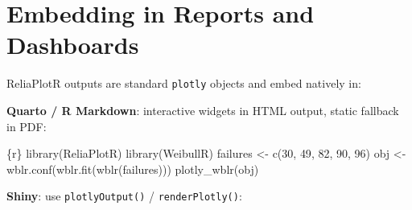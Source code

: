 \documentclass[
  letterpaper,
  DIV=11,
  numbers=noendperiod]{scrreprt}
\newenvironment{Shaded}{\begin{snugshade}}{\end{snugshade}}
\newcommand{\ControlFlowTok}[1]{\textcolor[rgb]{0.00,0.23,0.31}{\textbf{#1}}}
\newcommand{\DecValTok}[1]{\textcolor[rgb]{0.68,0.00,0.00}{#1}}
\newcommand{\FunctionTok}[1]{\textcolor[rgb]{0.28,0.35,0.67}{#1}}
\newcommand{\InformationTok}[1]{\textcolor[rgb]{0.37,0.37,0.37}{#1}}
\newcommand{\NormalTok}[1]{\textcolor[rgb]{0.00,0.23,0.31}{#1}}
\newcommand{\OtherTok}[1]{\textcolor[rgb]{0.00,0.23,0.31}{#1}}
\newcommand{\SpecialCharTok}[1]{\textcolor[rgb]{0.37,0.37,0.37}{#1}}
\newcommand{\StringTok}[1]{\textcolor[rgb]{0.13,0.47,0.30}{#1}}
\begin{document}
\section{Embedding in Reports and
Dashboards}\label{embedding-in-reports-and-dashboards}

ReliaPlotR outputs are standard \texttt{plotly} objects and embed
natively in:

\textbf{Quarto / R Markdown}: interactive widgets in HTML output, static
fallback in PDF:

\begin{Shaded}
\begin{Highlighting}[]
\InformationTok{\textasciigrave{}\textasciigrave{}\textasciigrave{}\{r\}}
\FunctionTok{library}\NormalTok{(ReliaPlotR)}
\FunctionTok{library}\NormalTok{(WeibullR)}
\NormalTok{failures }\OtherTok{\textless{}{-}} \FunctionTok{c}\NormalTok{(}\DecValTok{30}\NormalTok{, }\DecValTok{49}\NormalTok{, }\DecValTok{82}\NormalTok{, }\DecValTok{90}\NormalTok{, }\DecValTok{96}\NormalTok{)}
\NormalTok{obj }\OtherTok{\textless{}{-}} \FunctionTok{wblr.conf}\NormalTok{(}\FunctionTok{wblr.fit}\NormalTok{(}\FunctionTok{wblr}\NormalTok{(failures)))}
\FunctionTok{plotly\_wblr}\NormalTok{(obj)}
\InformationTok{\textasciigrave{}\textasciigrave{}\textasciigrave{}}
\end{Highlighting}
\end{Shaded}

\textbf{Shiny}: use \texttt{plotlyOutput()} / \texttt{renderPlotly()}:

\begin{Shaded}
\end{Shaded}
\end{document}
